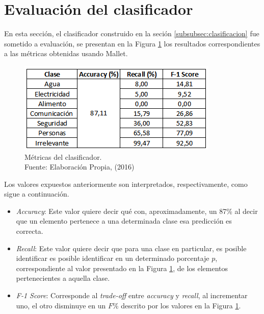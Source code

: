 \section{Evaluación del clasificador}
\label{sec:EvalClassificador}

En esta sección, el clasificador construido en la seción \ref{subsubsec:clasificacion} fue sometido a evaluación, se presentan en la Figura \ref{fig:metricasClass} los resultados correspondientes a las métricas obtenidas usando Mallet.

\begin{figure}[H]
        \centering
        \captionsetup{justification=centering}
        \includegraphics[scale=0.8]{images/MetricasClasificador.png}
        \caption[Métricas del clasificador.]{Métricas del clasificador.\\Fuente: Elaboración Propia, (2016)}
        \label{fig:metricasClass}
\end{figure}

Los valores expuestos anteriormente son interpretados, respectivamente, como sigue a continuación.

\begin{itemize}
\item \textit{Accuracy}: Este valor quiere decir qué con, aproximadamente, un 87\% al decir que un elemento pertenece a una determinada clase esa predicción es correcta.
\item \textit{Recall}: Este valor quiere decir que para una clase en particular, es posible identificar es posible identificar en un determinado porcentaje $p$, correspondiente al valor presentado en la Figura \ref{fig:metricasClass}, de los elementos pertenecientes a aquella clase.
\item \textit{F-1 Score}: Corresponde al \textit{trade-off} entre \textit{accuracy} y \textit{recall}, al incrementar uno, el otro disminuye en un $F$\% descrito por los valores en la Figura \ref{fig:metricasClass}.
\end{itemize}

